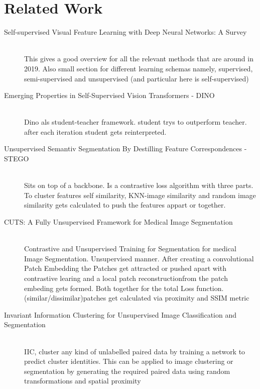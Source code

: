 \section*{Related Work}


\begin{description}
    \item[Self-supervised Visual Feature Learning with Deep Neural Networks: A Survey] \hfill \\ This gives a good overview for all the relevant methods that are around in 2019. Also small section for different learning schemas namely, supervised, semi-supervised and unsupervised (and particular here is self-supervised) \cite{jing2019selfsupervised}
    \item[Emerging Properties in Self-Supervised Vision Transformers - DINO] \hfill \\Dino als student-teacher framework. student trys to outperform teacher. after each iteration student gets reinterpreted.\cite{caron2021emerging}
    \item[Unsupervised Semantiv Segmentation By Destilling Feature Correspondences - STEGO] \hfill \\Sits on top of a backbone. Is a contrastive loss algorithm with three parts. To cluster features self similarity, KNN-image similarity and random image similarity gets calculated to push the features appart or together. \cite{hamilton2022unsupervised}
    \item[CUTS: A Fully Unsupervised Framework for Medical Image Segmentation] \hfill \\Contrastive and Unsupervised Training for Segmentation for medical Image Segmentation. Unsupervised manner. After creating a convolutional Patch Embedding the Patches get attracted or pushed apart with contrastive learing and a local patch reconstructionfrom the patch embeding gets formed. Both together for the total Loss function. (similar/dissimilar)patches get calculated via proximity and SSIM metric \cite{liu2023cuts}
    \item[Invariant Information Clustering for Unsupervised Image Classification and Segmentation] \hfill \\ IIC, cluster any kind of unlabelled paired data by training a network to predict cluster identities. This can be applied to image clustering or segmentation by generating the required paired data using random transformations and spatial proximity \cite{ji2019invariant}

\end{description}
